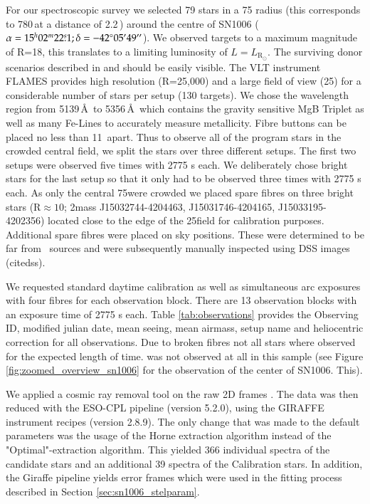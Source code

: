 For our spectroscopic survey we selected 79 stars in a 75 \arcsec radius (this corresponds to 780\,\kms at a distance of 2.2\,\kpc) around the centre of SN1006 ($\alpha = 15^h02^m22\overset{s}{.}1;\delta = -42^{\circ}05\hbox{$^\prime$}49\hbox{$^{\prime\prime}$}$). We observed targets to a maximum magnitude of R=18, this translates to a limiting luminosity of $L=L_{\textrm{R}_\odot}$. The surviving donor scenarios described in \citet{2000ApJS..128..615M} and \citet{2008A&A...489..943P} should be easily visible. 
The VLT instrument FLAMES provides high resolution (R=25,000) and a large field of view (25\arcmin) for a considerable number of stars per setup (130 targets). We chose the wavelength region from 5139\,\AA\ to 5356\,\AA\ which contains the gravity sensitive MgB Triplet as well as many Fe-Lines to accurately measure metallicity. Fibre buttons can be placed no less than 11\arcsec\ apart. Thus to observe all of the program stars in the crowded central field, we split the stars over three different setups. The first two setups were observed five times with 2775 s each. We deliberately chose bright stars for the last setup so that it only had to be observed three times with 2775 s each. As only the central 75\arcsec were crowded we placed spare fibres on three bright stars (R$\approx 10$; 2mass J15032744-4204463, J15031746-4204165, J15033195-4202356) located close to the edge of the 25\arcmin field for calibration purposes. Additional spare fibres were placed on sky positions. These were determined to be far from \twomass\ sources and were subsequently manually inspected using DSS images (citedss). 

We requested standard daytime calibration as well as simultaneous arc exposures with four fibres for each observation block. There are 13 observation blocks with an exposure time of 2775 s each. Table \ref{tab:observations} provides the Observing ID, modified julian date, mean seeing, mean airmass, setup name and heliocentric correction for all observations. 
Due to broken fibres not all stars where observed for the expected length of time.  was not observed at all in this sample (see Figure \ref{fig:zoomed_overview_sn1006} for the observation of the center of SN1006. This).

We applied a cosmic ray removal tool on the raw 2D frames \citep{2001PASP..113.1420V}. 
The data was then reduced with the ESO-CPL pipeline (version 5.2.0), using the GIRAFFE instrument recipes (version 2.8.9). The only change that was made to the default parameters was the usage of the Horne extraction algorithm instead of the "Optimal"-extraction algorithm. This yielded 366 individual spectra of the candidate stars and an additional 39 spectra of the Calibration stars. 
In addition,  the Giraffe pipeline yields error frames which were used in the fitting process described in Section \ref{sec:sn1006_stelparam}. 


